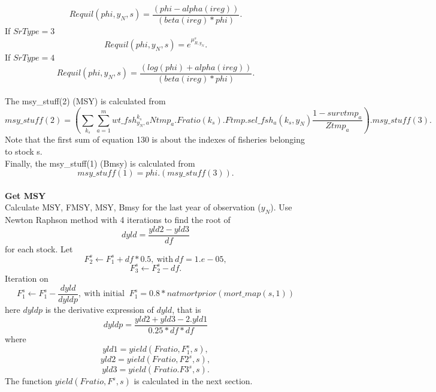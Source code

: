 \documentclass{article}
\begin{document}
\begin{equation}
Requil(phi,y_N,s)=\dfrac{(phi-alpha(ireg))}{(beta(ireg)*phi)}.
\end{equation}
If $SrType=3$
\begin{equation}
    Requil(phi,y_N,s)=e^{\mu^s_{R,y_N}}.
\end{equation}
If $SrType=4$
\begin{equation}
    Requil(phi,y_N,s)=\dfrac{(log(phi)+alpha(ireg))}{(beta(ireg)*phi)}.
\end{equation}
\\
The msy\_stuff(2) (MSY) is calculated from
\begin{equation}
    msy\_stuff(2)=\left(\sum_{k_s}\sum_{a=1}^m wt\_fsh^{k_s}_{y_N,a}Ntmp_a.Fratio(k_s).Ftmp.sel\_fsh_a(k_s,y_N)\dfrac{1-survtmp_a}{Ztmp_a}\right).msy\_stuff(3).
\end{equation}
Note that the first sum of equation 130 is about the indexes of fisheries belonging to stock s.\\
Finally, the msy\_stuff(1) (Bmsy) is calculated from
\begin{equation}
    msy\_stuff(1)=phi.(msy\_stuff(3)).
\end{equation}
\\
\textbf{Get MSY}\\

Calculate MSY, FMSY, MSY, Bmsy for the last year of observation ($y_N$). 
Use Newton Raphson method with 4 iterations to find the root of
\begin{equation}
        dyld=\dfrac{yld2-yld3}{df}
    \end{equation}
    for each stock.
    Let 
    \begin{equation}
        F_2^s \leftarrow F_1^s + df*0.5, \ \text{with}  \ df=1.e-05,
    \end{equation}
    \begin{equation}
        F_3^s\leftarrow F_2^s-df.
    \end{equation}
Iteration on
\begin{equation}
    F_1^s\leftarrow F_1^s-\dfrac{dyld}{dyldp}, \ \text{with initial } \ F_1^s=0.8*natmortprior(mort\_map(s,1))
\end{equation}
    here $dyldp$ is the derivative expression of $dyld$, that is
\begin{equation}
    dyldp=\dfrac{yld2+yld3 - 2.yld1}{0.25*df*df}
\end{equation}
where
\begin{equation}
    yld1=yield(Fratio,F_1^s,s),
\end{equation}
\begin{equation}
    yld2=yield(Fratio,F2^s,s),
\end{equation}
\begin{equation}
    yld3=yield(Fratio.F3^s,s).
\end{equation}
The function $yield(Fratio,F^s,s)$ is calculated in the next section.\\
\end{document}
